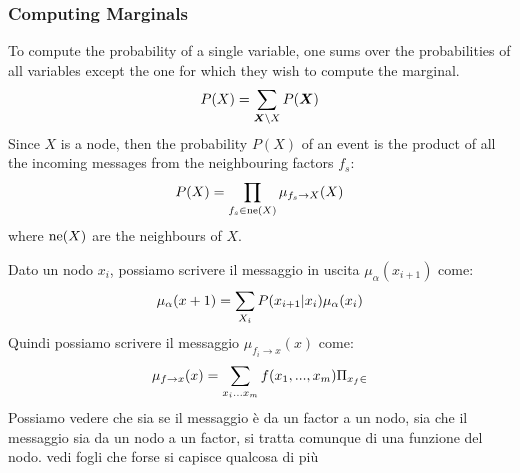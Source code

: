 \subsubsection{Computing Marginals}
To compute the probability of a single variable, one sums over the probabilities of all variables except the one for which they wish to compute the marginal. \newline
\[P(X)=\displaystyle\sum_{\bm{X}\setminus X}P(\bm{X})\]
Since $X$ is a node, then the probability $P(X)$ of an event is the product of all the incoming messages from the neighbouring factors $f_s$:
\[P(X)=\displaystyle\prod_{f_s\in \text{ne}(X)}\mu_{f_s\rightarrow X}(X)\]
where $\text{ne}(X)$ are the neighbours of $X$.


Dato un nodo $x_i$, possiamo scrivere il messaggio in uscita $\mu_{\alpha}(x_{i+1})$ come:
\[\mu_{\alpha}(x+1)=\displaystyle\sum_{X_i}P(x_{i+1}\vert x_i)\mu_\alpha(x_i)\]
Quindi possiamo scrivere il messaggio $\mu_{f_i\rightarrow x}(x)$ come: 
\[ \mu_{f\rightarrow x}(x)=\displaystyle\sum_{x_i...x_m}f(x_1, ..., x_m)\Pi_{x_f\in}\]
Possiamo vedere che sia se il messaggio è da un factor a un nodo, sia che il messaggio sia da un nodo a un factor, si tratta comunque di una funzione del nodo. \newline 
vedi fogli che forse si capisce qualcosa di più


